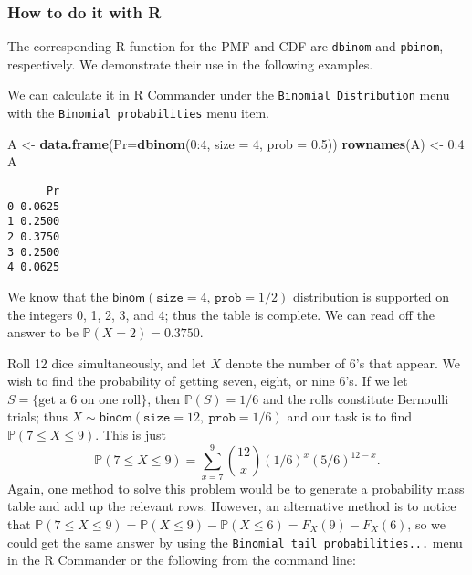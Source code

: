 \documentclass[]{book}
\newenvironment{Shaded}{\begin{snugshade}}{\end{snugshade}}
\newcommand{\KeywordTok}[1]{\textcolor[rgb]{0.13,0.29,0.53}{\textbf{{#1}}}}
\newcommand{\DataTypeTok}[1]{\textcolor[rgb]{0.13,0.29,0.53}{{#1}}}
\newcommand{\DecValTok}[1]{\textcolor[rgb]{0.00,0.00,0.81}{{#1}}}
\newcommand{\FloatTok}[1]{\textcolor[rgb]{0.00,0.00,0.81}{{#1}}}
\newcommand{\StringTok}[1]{\textcolor[rgb]{0.31,0.60,0.02}{{#1}}}
\newcommand{\NormalTok}[1]{{#1}}
\numberwithin{equation}{chapter}
\numberwithin{figure}{chapter}
\theoremstyle{plain}
\theoremstyle{definition}
\theoremstyle{remark}
\theoremstyle{definition}
\theoremstyle{definition}
\theoremstyle{remark}
\let\BeginKnitrBlock\begin \let\EndKnitrBlock\end
\begin{document}
\subsubsection{How to do it with R}\label{how-to-do-it-with-r-21}

The corresponding R function for the PMF and CDF are \texttt{dbinom} and
\texttt{pbinom}, respectively. We demonstrate their use in the following
examples.

\bigskip

\BeginKnitrBlock{example}
\protect\hypertarget{ex:unnamed-chunk-205}{}{\label{ex:unnamed-chunk-205}}We
can calculate it in R Commander under the
\texttt{Binomial\ Distribution} menu with the
\texttt{Binomial\ probabilities} menu item.
\EndKnitrBlock{example}

\begin{Shaded}
\begin{Highlighting}[]
\NormalTok{A <-}\StringTok{ }\KeywordTok{data.frame}\NormalTok{(}\DataTypeTok{Pr=}\KeywordTok{dbinom}\NormalTok{(}\DecValTok{0}\NormalTok{:}\DecValTok{4}\NormalTok{, }\DataTypeTok{size =} \DecValTok{4}\NormalTok{, }\DataTypeTok{prob =} \FloatTok{0.5}\NormalTok{))}
\KeywordTok{rownames}\NormalTok{(A) <-}\StringTok{ }\DecValTok{0}\NormalTok{:}\DecValTok{4} 
\NormalTok{A}
\end{Highlighting}
\end{Shaded}

\begin{verbatim}
      Pr
0 0.0625
1 0.2500
2 0.3750
3 0.2500
4 0.0625
\end{verbatim}

We know that the \(\mathsf{binom}(\mathtt{size}=4,\,\mathtt{prob}=1/2)\)
distribution is supported on the integers 0, 1, 2, 3, and 4; thus the
table is complete. We can read off the answer to be
\(\mathbb{P}(X=2)=0.3750\).

\bigskip

\BeginKnitrBlock{example}
\protect\hypertarget{ex:unnamed-chunk-207}{}{\label{ex:unnamed-chunk-207}}Roll
12 dice simultaneously, and let \(X\) denote the number of 6's that
appear. We wish to find the probability of getting seven, eight, or nine
6's. If we let \(S=\{ \mbox{get a 6 on one roll} \}\), then
\(\mathbb{P}(S)=1/6\) and the rolls constitute Bernoulli trials; thus
\(X\sim\mathsf{binom}(\mathtt{size}=12,\ \mathtt{prob}=1/6)\) and our
task is to find \(\mathbb{P}(7\leq X\leq9)\). This is just \[ 
\mathbb{P}(7\leq X\leq9)=\sum_{x=7}^{9}{12 \choose x}(1/6)^{x}(5/6)^{12-x}.
\] Again, one method to solve this problem would be to generate a
probability mass table and add up the relevant rows. However, an
alternative method is to notice that
\(\mathbb{P}(7\leq X\leq9)=\mathbb{P}(X\leq9)-\mathbb{P}(X\leq6)=F_{X}(9)-F_{X}(6)\),
so we could get the same answer by using the
\texttt{Binomial\ tail\ probabilities...} menu in the R Commander or the
following from the command line:
\EndKnitrBlock{example}
\end{document}
